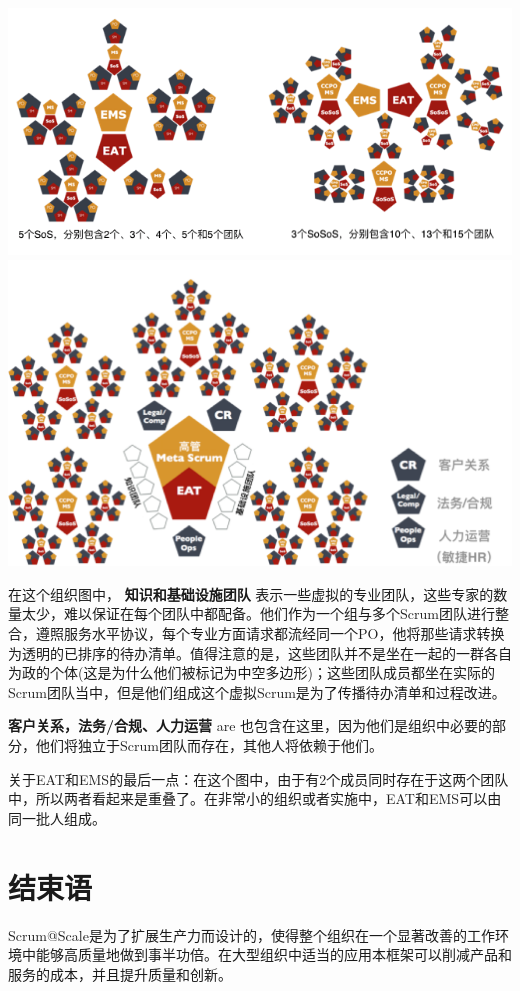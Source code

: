 \documentclass[12pt,a4paper,parskip=full]{scrartcl}
\begin{document}
\begin{CJK*}{UTF8}{gbsn}
\includegraphics[width=1.0\linewidth]{VariableSoS-R2.png}
\includegraphics[width=1.0\linewidth]{OrganizationalDiagram.png}

在这个组织图中， \textbf{知识和基础设施团队} 表示一些虚拟的专业团队，这些专家的数量太少，难以保证在每个团队中都配备。他们作为一个组与多个Scrum团队进行整合，遵照服务水平协议，每个专业方面请求都流经同一个PO，他将那些请求转换为透明的已排序的待办清单。值得注意的是，这些团队并不是坐在一起的一群各自为政的个体(这是为什么他们被标记为中空多边形)；这些团队成员都坐在实际的Scrum团队当中，但是他们组成这个虚拟Scrum是为了传播待办清单和过程改进。

\textbf{客户关系，法务/合规、人力运营} are
也包含在这里，因为他们是组织中必要的部分，他们将独立于Scrum团队而存在，其他人将依赖于他们。

关于EAT和EMS的最后一点：在这个图中，由于有2个成员同时存在于这两个团队中，所以两者看起来是重叠了。在非常小的组织或者实施中，EAT和EMS可以由同一批人组成。

\section{结束语}
Scrum@Scale是为了扩展生产力而设计的，使得整个组织在一个显著改善的工作环境中能够高质量地做到事半功倍。在大型组织中适当的应用本框架可以削减产品和服务的成本，并且提升质量和创新。


\end{CJK*}
\end{document}
